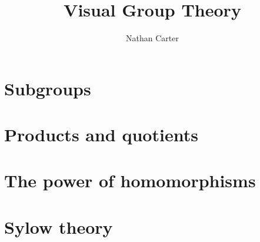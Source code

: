 \documentclass[11pt]{exam}
\author{Nathan Carter}
\title{Visual Group Theory}
\begin{document}
\maketitle
\thispagestyle{empty}



\section{Subgroups}

\section{Products and quotients}


\section{The power of homomorphisms}

\section{Sylow theory}
\end{document}
